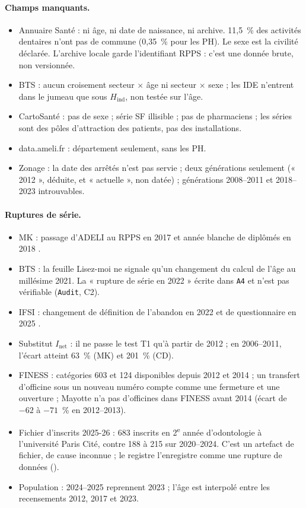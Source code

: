 \paragraph{Champs manquants.}
\begin{itemize}
  \item Annuaire Santé : ni âge, ni date de naissance, ni archive. 11,5~\%\mesure{} des activités dentaires
  n'ont pas de commune (0,35~\%\mesure{} pour les PH). Le sexe est la civilité déclarée. L'archive locale garde
  l'identifiant RPPS : c'est une donnée brute, non versionnée.
  \item BTS : aucun croisement secteur $\times$ âge ni secteur $\times$ sexe ; les IDE n'entrent dans le jumeau
  que sous $H_{\mathrm{ind}}$, non testée sur l'âge.
  \item CartoSanté : pas de sexe ; série SF illisible ; pas de pharmaciens ; les séries  sont
  des pôles d'attraction des patients, pas des installations.
  \item data.ameli.fr : département seulement, sans les PH.
  \item Zonage : la date des arrêtés n'est pas servie ; deux générations seulement (« 2012 », déduite, et
  « actuelle », non datée) ; générations 2008--2011 et 2018--2023 introuvables.
\end{itemize}

\paragraph{Ruptures de série.}
\begin{itemize}
  \item MK : passage d'ADELI au RPPS en 2017 et année blanche de diplômés en 2018 \citep{d-er1159}.
  \item BTS : la feuille Lisez-moi ne signale qu'un changement du calcul de l'âge au millésime 2021. La
  « rupture de série en 2022 » écrite dans \texttt{A4} et  n'est pas vérifiable
  (\texttt{Audit}, C2).
  \item IFSI : changement de définition de l'abandon en 2022 et de questionnaire en 2025 \citep{d-drees491}.
  \item Substitut $I_{\mathrm{net}}$ : il ne passe le test T1 qu'à partir de 2012 ; en 2006--2011, l'écart
  atteint 63~\%\mesure{} (MK) et 201~\%\mesure{} (CD).
  \item FINESS : catégories 603 et 124 disponibles depuis 2012 et 2014 ; un transfert d'officine sous un
  nouveau numéro compte comme une fermeture et une ouverture ; Mayotte n'a pas d'officines dans FINESS avant
  2014 (écart de $-62$ à $-71$~\%\mesure{} en 2012--2013).
  \item Fichier d'inscrits 2025-26 : \num{683}\mesure{} inscrits en 2\textsuperscript{e} année d'odontologie à
  l'université Paris Cité, contre 188 à 215\mesure{} sur 2020--2024. C'est un artefact de fichier, de cause
  inconnue ; le registre l'enregistre comme une rupture de données ().
  \item Population : 2024--2025 reprennent 2023\suppose{} ; l'âge est interpolé entre les recensements 2012,
  2017 et 2023.
\end{itemize}

